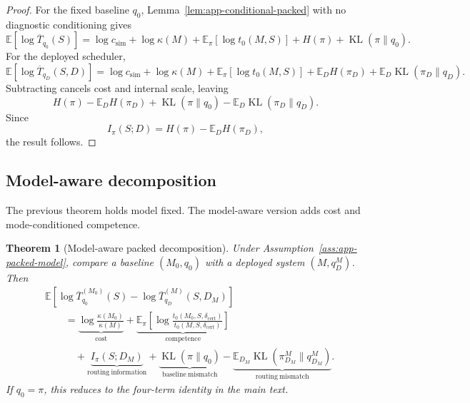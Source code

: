 \documentclass{article}
\newtheorem{theorem}{Theorem}
\DeclareMathOperator{\KL}{KL}
\newcommand{\E}{\mathbb{E}}
\begin{document}
\begin{proof}
For the fixed baseline \(q_0\), Lemma~\ref{lem:app-conditional-packed} with no diagnostic
conditioning gives
\[
    \E[\log \overline T_{q_0}(S)]
    =
    \log c_{\mathrm{sim}}
    +
    \log\kappa(M)
    +
    \E_\pi[\log t_0(M,S)]
    +
    H(\pi)
    +
    \KL(\pi\|q_0).
\]
For the deployed scheduler,
\[
    \E[\log \overline T_{q_D}(S,D)]
    =
    \log c_{\mathrm{sim}}
    +
    \log\kappa(M)
    +
    \E_\pi[\log t_0(M,S)]
    +
    \E_D H(\pi_D)
    +
    \E_D\KL(\pi_D\|q_D).
\]
Subtracting cancels cost and internal scale, leaving
\[
    H(\pi)-\E_DH(\pi_D)+\KL(\pi\|q_0)-\E_D\KL(\pi_D\|q_D).
\]
Since
\[
    I_\pi(S;D)=H(\pi)-\E_DH(\pi_D),
\]
the result follows.
\end{proof}

\subsection{Model-aware decomposition}

The previous theorem holds model fixed.
The model-aware version adds cost and mode-conditioned competence.

\begin{theorem}[Model-aware packed decomposition]
\label{thm:app-model-aware}
Under Assumption~\ref{ass:app-packed-model}, compare a baseline \((M_0,q_0)\) with a
deployed system \((M,q_D^M)\).
Then
\[
\boxed{
\begin{aligned}
&\E\!\left[
    \log \overline T^{(M_0)}_{q_0}(S)
    -
    \log \overline T^{(M)}_{q_D}(S,D_M)
\right]
\\
&\qquad =
\underbrace{\log\frac{\kappa(M_0)}{\kappa(M)}}_{\mathrm{cost}}
+
\underbrace{
\E_\pi
\left[
    \log\frac{t_0(M_0,S,\delta_{\mathrm{cert}})}
              {t_0(M,S,\delta_{\mathrm{cert}})}
\right]
}_{\mathrm{competence}}
\\
&\qquad\quad
+
\underbrace{I_\pi(S;D_M)}_{\mathrm{routing\ information}}
+
\underbrace{\KL(\pi\|q_0)}_{\mathrm{baseline\ mismatch}}
-
\underbrace{\E_{D_M}\KL(\pi_{D_M}^M\|q_{D_M}^M)}_{\mathrm{routing\ mismatch}} .
\end{aligned}
}
\]
If \(q_0=\pi\), this reduces to the four-term identity in the main text.
\end{theorem}
\end{document}
